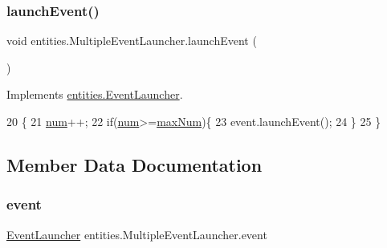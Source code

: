\subsubsection{\texorpdfstring{launch\+Event()}{launchEvent()}}
{\footnotesize\ttfamily void entities.\+Multiple\+Event\+Launcher.\+launch\+Event (\begin{DoxyParamCaption}{ }\end{DoxyParamCaption})\hspace{0.3cm}{\ttfamily [inline]}}



Implements \mbox{\hyperlink{interfaceentities_1_1_event_launcher_a4aa8692d30404ff21b04dfc688e8efe0}{entities.\+Event\+Launcher}}.


\begin{DoxyCode}
20                               \{
21         \mbox{\hyperlink{classentities_1_1_multiple_event_launcher_a35cd67fc18c6015e136245890bbdd9b1}{num}}++;
22         \textcolor{keywordflow}{if}(\mbox{\hyperlink{classentities_1_1_multiple_event_launcher_a35cd67fc18c6015e136245890bbdd9b1}{num}}>=\mbox{\hyperlink{classentities_1_1_multiple_event_launcher_a236cd02f077a8fcc6afbfb425817a4f3}{maxNum}})\{
23             \textcolor{keyword}{event}.launchEvent();
24         \}
25     \}
\end{DoxyCode}


\subsection{Member Data Documentation}
\mbox{\label{classentities_1_1_multiple_event_launcher_a2b7fce6ca63ed808d27e9d1d0469ce4a}} 
\subsubsection{\texorpdfstring{event}{event}}
{\footnotesize\ttfamily \mbox{\hyperlink{interfaceentities_1_1_event_launcher}{Event\+Launcher}} entities.\+Multiple\+Event\+Launcher.\+event\hspace{0.3cm}{\ttfamily [private]}}

\mbox{\label{classentities_1_1_multiple_event_launcher_a236cd02f077a8fcc6afbfb425817a4f3}} 
